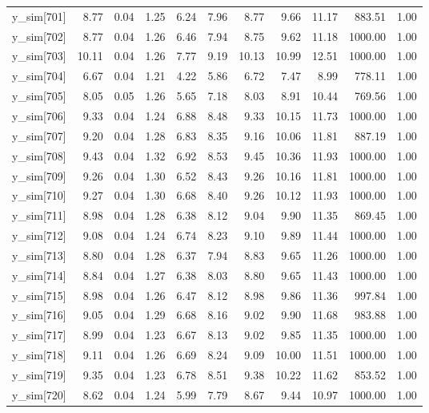 \begin{table}[ht]
\begin{tabular}{rrrrrrrrrrr}
  y\_sim[701] & 8.77 & 0.04 & 1.25 & 6.24 & 7.96 & 8.77 & 9.66 & 11.17 & 883.51 & 1.00 \\ 
  y\_sim[702] & 8.77 & 0.04 & 1.26 & 6.46 & 7.94 & 8.75 & 9.62 & 11.18 & 1000.00 & 1.00 \\ 
  y\_sim[703] & 10.11 & 0.04 & 1.26 & 7.77 & 9.19 & 10.13 & 10.99 & 12.51 & 1000.00 & 1.00 \\ 
  y\_sim[704] & 6.67 & 0.04 & 1.21 & 4.22 & 5.86 & 6.72 & 7.47 & 8.99 & 778.11 & 1.00 \\ 
  y\_sim[705] & 8.05 & 0.05 & 1.26 & 5.65 & 7.18 & 8.03 & 8.91 & 10.44 & 769.56 & 1.00 \\ 
  y\_sim[706] & 9.33 & 0.04 & 1.24 & 6.88 & 8.48 & 9.33 & 10.15 & 11.73 & 1000.00 & 1.00 \\ 
  y\_sim[707] & 9.20 & 0.04 & 1.28 & 6.83 & 8.35 & 9.16 & 10.06 & 11.81 & 887.19 & 1.00 \\ 
  y\_sim[708] & 9.43 & 0.04 & 1.32 & 6.92 & 8.53 & 9.45 & 10.36 & 11.93 & 1000.00 & 1.00 \\ 
  y\_sim[709] & 9.26 & 0.04 & 1.30 & 6.52 & 8.43 & 9.26 & 10.16 & 11.81 & 1000.00 & 1.00 \\ 
  y\_sim[710] & 9.27 & 0.04 & 1.30 & 6.68 & 8.40 & 9.26 & 10.12 & 11.93 & 1000.00 & 1.00 \\ 
  y\_sim[711] & 8.98 & 0.04 & 1.28 & 6.38 & 8.12 & 9.04 & 9.90 & 11.35 & 869.45 & 1.00 \\ 
  y\_sim[712] & 9.08 & 0.04 & 1.24 & 6.74 & 8.23 & 9.10 & 9.89 & 11.44 & 1000.00 & 1.00 \\ 
  y\_sim[713] & 8.80 & 0.04 & 1.28 & 6.37 & 7.94 & 8.83 & 9.65 & 11.26 & 1000.00 & 1.00 \\ 
  y\_sim[714] & 8.84 & 0.04 & 1.27 & 6.38 & 8.03 & 8.80 & 9.65 & 11.43 & 1000.00 & 1.00 \\ 
  y\_sim[715] & 8.98 & 0.04 & 1.26 & 6.47 & 8.12 & 8.98 & 9.86 & 11.36 & 997.84 & 1.00 \\ 
  y\_sim[716] & 9.05 & 0.04 & 1.29 & 6.68 & 8.16 & 9.02 & 9.90 & 11.68 & 983.88 & 1.00 \\ 
  y\_sim[717] & 8.99 & 0.04 & 1.23 & 6.67 & 8.13 & 9.02 & 9.85 & 11.35 & 1000.00 & 1.00 \\ 
  y\_sim[718] & 9.11 & 0.04 & 1.26 & 6.69 & 8.24 & 9.09 & 10.00 & 11.51 & 1000.00 & 1.00 \\ 
  y\_sim[719] & 9.35 & 0.04 & 1.23 & 6.78 & 8.51 & 9.38 & 10.22 & 11.62 & 853.52 & 1.00 \\ 
  y\_sim[720] & 8.62 & 0.04 & 1.24 & 5.99 & 7.79 & 8.67 & 9.44 & 10.97 & 1000.00 & 1.00 \\ 

\end{tabular}
\end{table}
